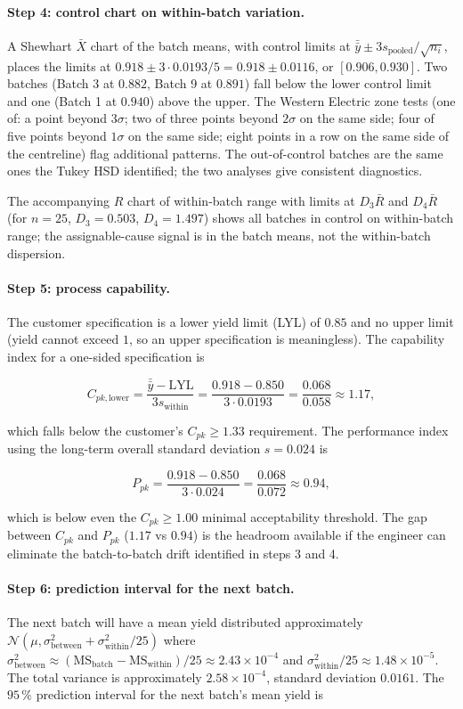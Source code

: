 \paragraph{Step 4: control chart on within-batch variation.}
A Shewhart $\bar{X}$ chart of the batch means, with control
limits at $\bar{\bar{y}} \pm 3 s_{\text{pooled}}/\sqrt{n_{i}}$,
places the limits at $0.918 \pm 3 \cdot 0.0193/5 = 0.918 \pm
0.0116$, or $[0.906, 0.930]$. Two batches (Batch 3 at $0.882$,
Batch 9 at $0.891$) fall below the lower control limit and one
(Batch 1 at $0.940$) above the upper. The Western Electric
zone tests (one of: a point beyond $3\sigma$; two of three
points beyond $2\sigma$ on the same side; four of five points
beyond $1\sigma$ on the same side; eight points in a row on the
same side of the centreline) flag additional patterns. The
out-of-control batches are the same ones the Tukey HSD
identified; the two analyses give consistent diagnostics.

The accompanying $R$ chart of within-batch range with limits at
$D_{3} \bar{R}$ and $D_{4} \bar{R}$ (for $n = 25$, $D_{3} =
0.503$, $D_{4} = 1.497$) shows all batches in control on
within-batch range; the assignable-cause signal is in the batch
means, not the within-batch dispersion.

\paragraph{Step 5: process capability.} The customer
specification is a lower yield limit (LYL) of $0.85$ and no
upper limit (yield cannot exceed $1$, so an upper specification
is meaningless). The capability index for a one-sided
specification is

\[
C_{pk, \text{lower}} = \frac{\bar{\bar{y}} - \text{LYL}}{3 s_{
\text{within}}}
= \frac{0.918 - 0.850}{3 \cdot 0.0193}
= \frac{0.068}{0.058}
\approx 1.17,
\]

\noindent
which falls below the customer's $C_{pk} \geq 1.33$ requirement.
The performance index using the long-term overall standard
deviation $s = 0.024$ is

\[
P_{pk} = \frac{0.918 - 0.850}{3 \cdot 0.024}
= \frac{0.068}{0.072}
\approx 0.94,
\]

\noindent
which is below even the $C_{pk} \geq 1.00$ minimal acceptability
threshold. The gap between $C_{pk}$ and $P_{pk}$ ($1.17$ vs
$0.94$) is the headroom available if the engineer can eliminate
the batch-to-batch drift identified in steps 3 and 4.

\paragraph{Step 6: prediction interval for the next batch.}
The next batch will have a mean yield distributed approximately
$\mathcal{N}(\mu, \sigma^{2}_{\text{between}} + \sigma^{2}_{\text{
within}}/25)$ where $\sigma^{2}_{\text{between}} \approx
(\text{MS}_{\text{batch}} - \text{MS}_{\text{within}})/25 \approx
2.43 \times 10^{-4}$ and $\sigma^{2}_{\text{within}}/25 \approx
1.48 \times 10^{-5}$. The total variance is approximately
$2.58 \times 10^{-4}$, standard deviation $0.0161$. The $95 \,\%$
prediction interval for the next batch's mean yield is

